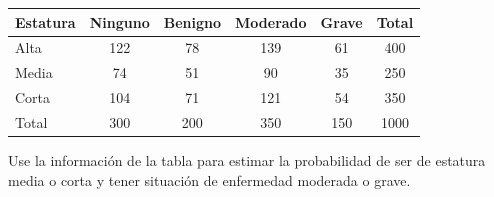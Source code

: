 \documentclass[letterpaper,fleqn]{article}
\begin{document}
\begin{enumerate}
\begin{center}
\begin{tabular}{lccccc}
Estatura & Ninguno & Benigno & Moderado & Grave & Total \\ \hline
Alta & 122 & 78 & 139 & 61 & 400 \\ 
Media & 74 & 51 & 90 & 35 & 250 \\ 
Corta & 104 & 71 & 121 & 54 & 350 \\ 
\hline 
Total & 300 & 200 & 350 & 150 & 1000 \\ 
\hline 
\end{tabular} 
\end{center}
Use la información de la tabla para estimar la probabilidad de ser de estatura media o corta y tener situación de enfermedad moderada o grave.\noanswer
 \end{enumerate}
\end{document}
